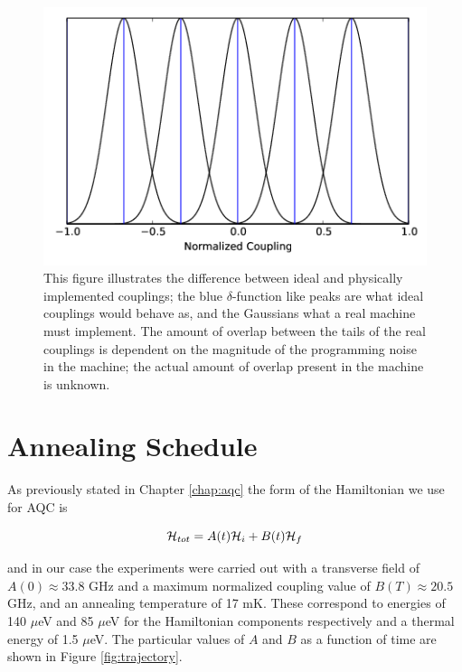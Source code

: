 \begin{figure}
	\includegraphics[bb= 0 0 441 297]{img/coupling_spread.png}
	\caption[Ideal vs. Physical Couplings]{This figure illustrates the difference between ideal and physically implemented couplings; the blue $\delta$-function like peaks are what ideal couplings would behave as, and the Gaussians what a real machine must implement.  The amount of overlap between the tails of the real couplings is dependent on the magnitude of the programming noise in the machine; the actual amount of overlap present in the \machine machine is unknown.}
	\label{fig:coupling_spread}
\end{figure}

\section{Annealing Schedule}
As previously stated in Chapter \ref{chap:aqc} the form of the Hamiltonian we use for AQC is

\begin{equation}
	\mathcal{H}_{tot} = A(t)\mathcal{H}_i + B(t)\mathcal{H}_f
\end{equation}

and in our case the experiments were carried out with a transverse field of $A(0) \approx 33.8 $ GHz and a maximum normalized coupling value of $B(T) \approx 20.5$ GHz, and an annealing temperature of 17 mK.  These correspond to energies of 140 $\mu$eV and 85 $\mu$eV for the Hamiltonian components respectively and a thermal energy of 1.5 $\mu$eV.  The particular values of $A$ and $B$ as a function of time are shown in Figure \ref{fig:trajectory}.

